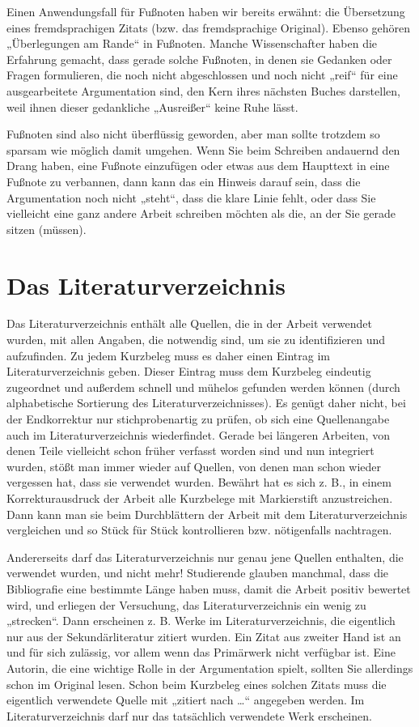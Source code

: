 \documentclass[]{book}
\theoremstyle{definition}
\theoremstyle{definition}
\theoremstyle{definition}
\theoremstyle{remark}
\begin{document}
Einen Anwendungsfall für Fußnoten haben wir bereits erwähnt: die
Übersetzung eines fremdsprachigen Zitats (bzw. das fremdsprachige
Original). Ebenso gehören „Überlegungen am Rande`` in Fußnoten. Manche
Wissenschafter haben die Erfahrung gemacht, dass gerade solche Fußnoten,
in denen sie Gedanken oder Fragen formulieren, die noch nicht
abgeschlossen und noch nicht „reif`` für eine ausgearbeitete
Argumentation sind, den Kern ihres nächsten Buches darstellen, weil
ihnen dieser gedankliche „Ausreißer`` keine Ruhe lässt.

Fußnoten sind also nicht überflüssig geworden, aber man sollte trotzdem
so sparsam wie möglich damit umgehen. Wenn Sie beim Schreiben andauernd
den Drang haben, eine Fußnote einzufügen oder etwas aus dem Haupttext in
eine Fußnote zu verbannen, dann kann das ein Hinweis darauf sein, dass
die Argumentation noch nicht „steht``, dass die klare Linie fehlt, oder
dass Sie vielleicht eine ganz andere Arbeit schreiben möchten als die,
an der Sie gerade sitzen (müssen).

\hypertarget{literaturverzeichnis}{\section{Das
Literaturverzeichnis}\label{literaturverzeichnis}}

Das Literaturverzeichnis enthält alle Quellen, die in der Arbeit
verwendet wurden, mit allen Angaben, die notwendig sind, um sie zu
identifizieren und aufzufinden. Zu jedem Kurzbeleg muss es daher einen
Eintrag im Literaturverzeichnis geben. Dieser Eintrag muss dem Kurzbeleg
eindeutig zugeordnet und außerdem schnell und mühelos gefunden werden
können (durch alphabetische Sortierung des Literaturverzeichnisses). Es
genügt daher nicht, bei der Endkorrektur nur stichprobenartig zu prüfen,
ob sich eine Quellenangabe auch im Literaturverzeichnis wiederfindet.
Gerade bei längeren Arbeiten, von denen Teile vielleicht schon früher
verfasst worden sind und nun integriert wurden, stößt man immer wieder
auf Quellen, von denen man schon wieder vergessen hat, dass sie
verwendet wurden. Bewährt hat es sich z. B., in einem Korrekturausdruck
der Arbeit alle Kurzbelege mit Markierstift anzustreichen. Dann kann man
sie beim Durchblättern der Arbeit mit dem Literaturverzeichnis
vergleichen und so Stück für Stück kontrollieren bzw. nötigenfalls
nachtragen.

Andererseits darf das Literaturverzeichnis nur genau jene Quellen
enthalten, die verwendet wurden, und nicht mehr! Studierende glauben
manchmal, dass die Bibliografie eine bestimmte Länge haben muss, damit
die Arbeit positiv bewertet wird, und erliegen der Versuchung, das
Literaturverzeichnis ein wenig zu „strecken``. Dann erscheinen z. B.
Werke im Literaturverzeichnis, die eigentlich nur aus der
Sekundärliteratur zitiert wurden. Ein Zitat aus zweiter Hand ist an und
für sich zulässig, vor allem wenn das Primärwerk nicht verfügbar ist.
Eine Autorin, die eine wichtige Rolle in der Argumentation spielt,
sollten Sie allerdings schon im Original lesen. Schon beim Kurzbeleg
eines solchen Zitats muss die eigentlich verwendete Quelle mit „zitiert
nach \ldots{}`` angegeben werden. Im Literaturverzeichnis darf nur das
tatsächlich verwendete Werk erscheinen.
\end{document}
